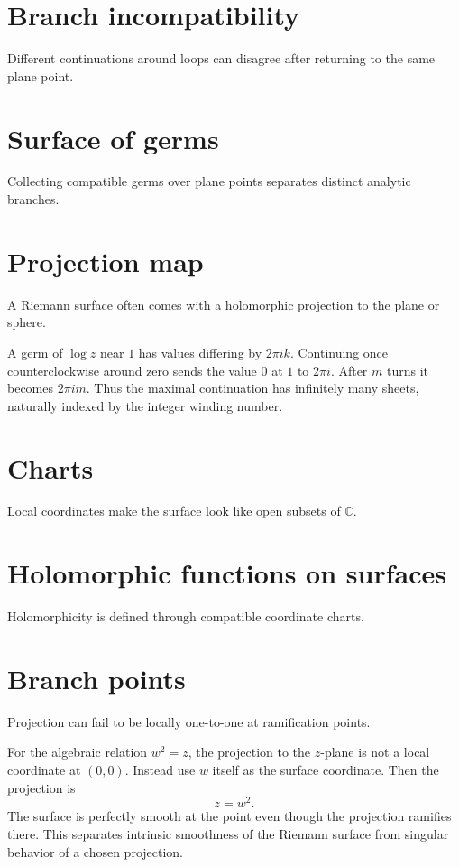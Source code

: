 \section{Branch incompatibility}
Different continuations around loops can disagree after returning to the same plane point.

\section{Surface of germs}
Collecting compatible germs over plane points separates distinct analytic branches.

\section{Projection map}
A Riemann surface often comes with a holomorphic projection to the plane or sphere.

\begin{example}\label{ex:iv22-expand-02}
A germ of \(\log z\) near \(1\) has values differing by \(2\pi i k\). Continuing once counterclockwise around zero sends the value \(0\) at \(1\) to \(2\pi i\). After \(m\) turns it becomes \(2\pi i m\). Thus the maximal continuation has infinitely many sheets, naturally indexed by the integer winding number.
\end{example}
\section{Charts}
Local coordinates make the surface look like open subsets of $\mathbb C$.

\section{Holomorphic functions on surfaces}
Holomorphicity is defined through compatible coordinate charts.

\section{Branch points}
Projection can fail to be locally one-to-one at ramification points.

\begin{example}\label{ex:iv22-expand-03}
For the algebraic relation \(w^2=z\), the projection to the \(z\)-plane is not a local coordinate at \((0,0)\). Instead use \(w\) itself as the surface coordinate. Then the projection is
\[
z=w^2.
\]
The surface is perfectly smooth at the point even though the projection ramifies there. This separates intrinsic smoothness of the Riemann surface from singular behavior of a chosen projection.
\end{example}
